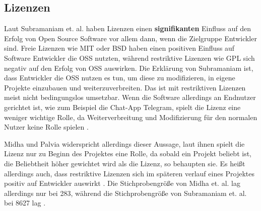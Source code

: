\subsection{Lizenzen}



Laut Subramaniam et. al. haben Lizenzen einen \textbf{signifikanten} Einfluss auf den Erfolg von 
Open Source Software vor allem dann, wenn die Zielgruppe Entwickler sind.
Freie Lizenzen wie MIT oder BSD haben einen positiven Einfluss auf Software Entwickler die OSS nutzten,
während restriktive Lizenzen wie GPL sich negativ auf den Erfolg von OSS auswirken.
Die Erklärung von Subramaniam ist, dass Entwickler die OSS nutzen es tun, um diese zu
modifizieren, in eigene Projekte einzubauen und weiterzuverbreiten. Das ist mit
restriktiven Lizenzen meist nicht bedingungslos umsetzbar. Wenn die Software allerdings an Endnutzer
gerichtet ist, wie zum Beispiel die Chat-App Telegram, spielt die Lizenz eine weniger wichtige Rolle, 
da Weiterverbreitung und Modifizierung
für den normalen Nutzer keine Rolle spielen \cite{subramaniamDeterminantsOpenSource2009}.

Midha und Palvia widerspricht allerdings dieser Aussage, laut ihnen spielt die Lizenz nur zu Beginn
des Projektes eine Rolle, da sobald ein Projekt beliebt ist, die Beliebtheit höher gewichtet wird als
die Lizenz, so behaupten sie.
Es heißt allerdings auch, dass restriktive Lizenzen sich im späteren verlauf eines Projektes positiv
auf Entwickler auswirkt \cite{midhaFactorsAffectingSuccess2012}. %
Die Stichprobengröße von Midha et. al. lag allerdings nur bei 283, %
während die Stichprobengröße von Subramaniam et. al. bei 
8627 lag \cite{subramaniamDeterminantsOpenSource2009}. %


